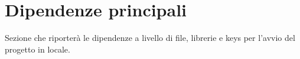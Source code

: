 \section{Dipendenze principali}

Sezione che riporterà le dipendenze a livello di file, librerie e keys per l'avvio del progetto in locale.

